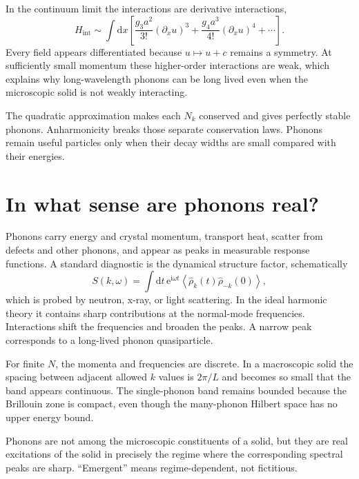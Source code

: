 \documentclass[11pt]{article}
\newcommand{\dd}{\mathrm{d}}
\newcommand{\e}{\mathrm{e}}
\newcommand{\ii}{\mathrm{i}}
\begin{document}
In the continuum limit the interactions are derivative interactions,
\begin{equation}
  H_{\mathrm{int}}
  \sim\int\dd x\left[
    \frac{g_3a^2}{3!}(\partial_xu)^3
    +\frac{g_4a^3}{4!}(\partial_xu)^4+\cdots
  \right].
  \label{eq:continuuminteractions}
\end{equation}
Every field appears differentiated because $u\mapsto u+c$ remains a
symmetry.  At sufficiently small momentum these higher-order interactions
are weak, which explains why long-wavelength phonons can be long lived even
when the microscopic solid is not weakly interacting.

\begin{keyidea}
The quadratic approximation makes each $N_k$ conserved and gives perfectly
stable phonons.  Anharmonicity breaks those separate conservation laws.
Phonons remain useful particles only when their decay widths are small
compared with their energies.
\end{keyidea}

\section{In what sense are phonons real?}

Phonons carry energy and crystal momentum, transport heat, scatter from
defects and other phonons, and appear as peaks in measurable response
functions.  A standard diagnostic is the dynamical structure factor,
schematically
\begin{equation}
  S(k,\omega)
  =\int\dd t\,\e^{\ii\omega t}
  \left\langle \hat\rho_k(t)\hat\rho_{-k}(0)\right\rangle,
  \label{eq:structurefactor}
\end{equation}
which is probed by neutron, x-ray, or light scattering.  In the ideal
harmonic theory it contains sharp contributions at the normal-mode
frequencies.  Interactions shift the frequencies and broaden the peaks.  A
narrow peak corresponds to a long-lived phonon quasiparticle.

For finite $N$, the momenta and frequencies are discrete.  In a macroscopic
solid the spacing between adjacent allowed $k$ values is $2\pi/L$ and becomes
so small that the band appears continuous.  The single-phonon band remains
bounded because the Brillouin zone is compact, even though the many-phonon
Hilbert space has no upper energy bound.

\begin{remarkbox}
Phonons are not among the microscopic constituents of a solid, but they are
real excitations of the solid in precisely the regime where the corresponding
spectral peaks are sharp.  ``Emergent'' means regime-dependent, not fictitious.
\end{remarkbox}
\end{document}
